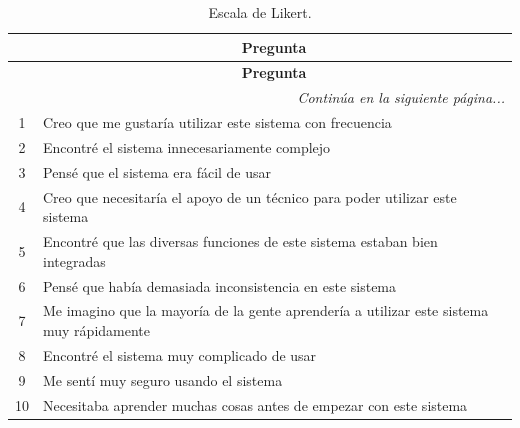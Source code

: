 \begin{longtable}[c]{|c|m{}|}
    \caption{Escala de Likert.}
    \label{tab:escalaLikert} \\
    
     \hline
    \rowcolor{gray!50}
    \multicolumn{1}{|c|}{\textbf{No.}} & \multicolumn{1}{c|}{\textbf{Pregunta}} \\
    \hline
    \endfirsthead

    \hline
    \rowcolor{gray!50}
    \multicolumn{1}{|c|}{\textbf{No.}} & \multicolumn{1}{c|}{\textbf{Pregunta}} \\
    \hline
    \endhead

    \multicolumn{2}{r}{\textit{Continúa en la siguiente página...}} \\
    \endfoot
    
    \endlastfoot

    1 & Creo que me gustaría utilizar este sistema con frecuencia \\
    \hline
    2 & Encontré el sistema innecesariamente complejo \\
    \hline
    3 & Pensé que el sistema era fácil de usar \\
    \hline
    4 & Creo que necesitaría el apoyo de un técnico para poder utilizar este sistema \\
    \hline
    5 & Encontré que las diversas funciones de este sistema estaban bien integradas \\
    \hline
    6 & Pensé que había demasiada inconsistencia en este sistema \\
    \hline
    7 & Me imagino que la mayoría de la gente aprendería a utilizar este sistema muy rápidamente \\
    \hline
    8 & Encontré el sistema muy complicado de usar \\
    \hline
    9 & Me sentí muy seguro usando el sistema \\
    \hline
    10 & Necesitaba aprender muchas cosas antes de empezar con este sistema \\
    \hline
\end{longtable}